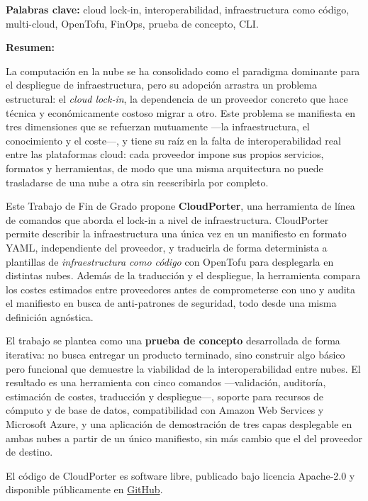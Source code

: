 \newpage
\begin{center}
    {\large \textbf{\tfgTitle}}

    \vspace{0.3cm}
    {\normalsize \tfgAuthors}

    \vspace{0.3cm}
\end{center}

\vspace{0.5cm}

\textbf{Palabras clave:} cloud lock-in, interoperabilidad, infraestructura como código,
multi-cloud, OpenTofu, FinOps, prueba de concepto, CLI.

\vspace{0.5cm}

\textbf{Resumen:}

La computación en la nube se ha consolidado como el paradigma dominante para el despliegue de
infraestructura, pero su adopción arrastra un problema estructural: el \textit{cloud lock-in},
la dependencia de un proveedor concreto que hace técnica y económicamente costoso migrar a otro.
Este problema se manifiesta en tres dimensiones que se refuerzan mutuamente —la infraestructura,
el conocimiento y el coste—, y tiene su raíz en la falta de interoperabilidad real entre las
plataformas cloud: cada proveedor impone sus propios servicios, formatos y herramientas, de modo
que una misma arquitectura no puede trasladarse de una nube a otra sin reescribirla por completo.

Este Trabajo de Fin de Grado propone \textbf{CloudPorter}, una herramienta de línea de comandos
que aborda el lock-in a nivel de infraestructura. CloudPorter permite describir la infraestructura
una única vez en un manifiesto en formato YAML, independiente del proveedor, y traducirla de forma
determinista a plantillas de \textit{infraestructura como código} con OpenTofu para desplegarla
en distintas nubes. Además de la traducción y el despliegue, la herramienta compara los costes
estimados entre proveedores antes de comprometerse con uno y audita el manifiesto en busca de
anti-patrones de seguridad, todo desde una misma definición agnóstica.

El trabajo se plantea como una \textbf{prueba de concepto} desarrollada de forma iterativa: no
busca entregar un producto terminado, sino construir algo básico pero funcional que demuestre la
viabilidad de la interoperabilidad entre nubes. El resultado es una herramienta con cinco
comandos —validación, auditoría, estimación de costes, traducción y despliegue—, soporte para
recursos de cómputo y de base de datos, compatibilidad con Amazon Web Services y Microsoft Azure,
y una aplicación de demostración de tres capas desplegable en ambas nubes a partir de un único
manifiesto, sin más cambio que el del proveedor de destino.

\vspace{0.5cm}

\noindent El código de CloudPorter es software libre, publicado bajo licencia Apache-2.0 y
disponible públicamente en \href{https://github.com/lucpez/cloudporter}{GitHub}.
